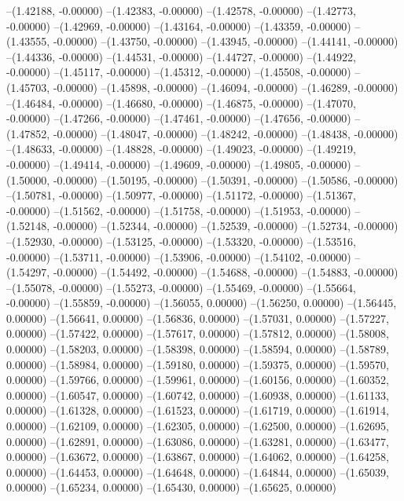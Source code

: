 --(1.42188, -0.00000)
--(1.42383, -0.00000)
--(1.42578, -0.00000)
--(1.42773, -0.00000)
--(1.42969, -0.00000)
--(1.43164, -0.00000)
--(1.43359, -0.00000)
--(1.43555, -0.00000)
--(1.43750, -0.00000)
--(1.43945, -0.00000)
--(1.44141, -0.00000)
--(1.44336, -0.00000)
--(1.44531, -0.00000)
--(1.44727, -0.00000)
--(1.44922, -0.00000)
--(1.45117, -0.00000)
--(1.45312, -0.00000)
--(1.45508, -0.00000)
--(1.45703, -0.00000)
--(1.45898, -0.00000)
--(1.46094, -0.00000)
--(1.46289, -0.00000)
--(1.46484, -0.00000)
--(1.46680, -0.00000)
--(1.46875, -0.00000)
--(1.47070, -0.00000)
--(1.47266, -0.00000)
--(1.47461, -0.00000)
--(1.47656, -0.00000)
--(1.47852, -0.00000)
--(1.48047, -0.00000)
--(1.48242, -0.00000)
--(1.48438, -0.00000)
--(1.48633, -0.00000)
--(1.48828, -0.00000)
--(1.49023, -0.00000)
--(1.49219, -0.00000)
--(1.49414, -0.00000)
--(1.49609, -0.00000)
--(1.49805, -0.00000)
--(1.50000, -0.00000)
--(1.50195, -0.00000)
--(1.50391, -0.00000)
--(1.50586, -0.00000)
--(1.50781, -0.00000)
--(1.50977, -0.00000)
--(1.51172, -0.00000)
--(1.51367, -0.00000)
--(1.51562, -0.00000)
--(1.51758, -0.00000)
--(1.51953, -0.00000)
--(1.52148, -0.00000)
--(1.52344, -0.00000)
--(1.52539, -0.00000)
--(1.52734, -0.00000)
--(1.52930, -0.00000)
--(1.53125, -0.00000)
--(1.53320, -0.00000)
--(1.53516, -0.00000)
--(1.53711, -0.00000)
--(1.53906, -0.00000)
--(1.54102, -0.00000)
--(1.54297, -0.00000)
--(1.54492, -0.00000)
--(1.54688, -0.00000)
--(1.54883, -0.00000)
--(1.55078, -0.00000)
--(1.55273, -0.00000)
--(1.55469, -0.00000)
--(1.55664, -0.00000)
--(1.55859, -0.00000)
--(1.56055, 0.00000)
--(1.56250, 0.00000)
--(1.56445, 0.00000)
--(1.56641, 0.00000)
--(1.56836, 0.00000)
--(1.57031, 0.00000)
--(1.57227, 0.00000)
--(1.57422, 0.00000)
--(1.57617, 0.00000)
--(1.57812, 0.00000)
--(1.58008, 0.00000)
--(1.58203, 0.00000)
--(1.58398, 0.00000)
--(1.58594, 0.00000)
--(1.58789, 0.00000)
--(1.58984, 0.00000)
--(1.59180, 0.00000)
--(1.59375, 0.00000)
--(1.59570, 0.00000)
--(1.59766, 0.00000)
--(1.59961, 0.00000)
--(1.60156, 0.00000)
--(1.60352, 0.00000)
--(1.60547, 0.00000)
--(1.60742, 0.00000)
--(1.60938, 0.00000)
--(1.61133, 0.00000)
--(1.61328, 0.00000)
--(1.61523, 0.00000)
--(1.61719, 0.00000)
--(1.61914, 0.00000)
--(1.62109, 0.00000)
--(1.62305, 0.00000)
--(1.62500, 0.00000)
--(1.62695, 0.00000)
--(1.62891, 0.00000)
--(1.63086, 0.00000)
--(1.63281, 0.00000)
--(1.63477, 0.00000)
--(1.63672, 0.00000)
--(1.63867, 0.00000)
--(1.64062, 0.00000)
--(1.64258, 0.00000)
--(1.64453, 0.00000)
--(1.64648, 0.00000)
--(1.64844, 0.00000)
--(1.65039, 0.00000)
--(1.65234, 0.00000)
--(1.65430, 0.00000)
--(1.65625, 0.00000)
